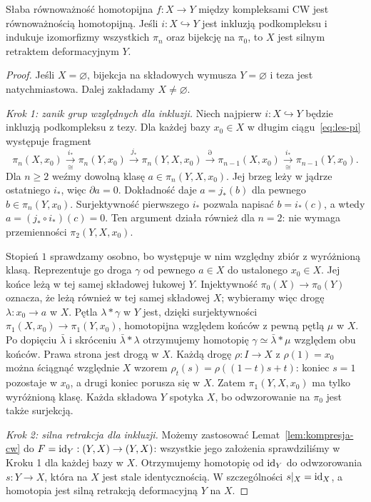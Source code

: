 \begin{twierdzenie}[Whitehead]
\label{thm:whitehead}
Słaba równoważność homotopijna $f:X\to Y$ między kompleksami CW
jest równoważnością homotopijną. Jeśli $i:X\hookrightarrow Y$
jest inkluzją podkompleksu i indukuje izomorfizmy wszystkich
$\pi_n$ oraz bijekcję na $\pi_0$, to $X$ jest silnym retraktem
deformacyjnym $Y$.
\end{twierdzenie}
\begin{proof}
Jeśli $X=\varnothing$, bijekcja na składowych wymusza
$Y=\varnothing$ i teza jest natychmiastowa.
Dalej zakładamy $X\ne\varnothing$.

\emph{Krok 1: zanik grup względnych dla inkluzji.}
Niech najpierw $i:X\hookrightarrow Y$ będzie inkluzją
podkompleksu z tezy. Dla każdej bazy $x_0\in X$
w długim ciągu~\eqref{eq:les-pi} występuje fragment
\[
 \pi_n(X,x_0)\xrightarrow[\cong]{i_*}\pi_n(Y,x_0)
 \xrightarrow{j_*}\pi_n(Y,X,x_0)
 \xrightarrow{\partial}\pi_{n-1}(X,x_0)
 \xrightarrow[\cong]{i_*}\pi_{n-1}(Y,x_0).
\]
Dla $n\geq2$ weźmy dowolną klasę $a\in\pi_n(Y,X,x_0)$.
Jej brzeg leży w jądrze ostatniego $i_*$, więc $\partial a=0$.
Dokładność daje $a=j_*(b)$ dla pewnego $b\in\pi_n(Y,x_0)$.
Surjektywność pierwszego $i_*$ pozwala napisać $b=i_*(c)$,
a wtedy $a=(j_*\circ i_*)(c)=0$.
Ten argument działa również dla $n=2$: nie wymaga przemienności
$\pi_2(Y,X,x_0)$.

Stopień $1$ sprawdzamy osobno, bo występuje w nim względny
zbiór z wyróżnioną klasą. Reprezentuje go droga $\gamma$
od pewnego $a\in X$ do ustalonego $x_0\in X$.
Jej końce leżą w tej samej składowej łukowej $Y$.
Injektywność $\pi_0(X)\to\pi_0(Y)$ oznacza, że leżą również
w tej samej składowej $X$; wybieramy więc drogę
$\lambda:x_0\to a$ w $X$.
Pętla $\lambda*\gamma$ w $Y$ jest, dzięki surjektywności
$\pi_1(X,x_0)\to\pi_1(Y,x_0)$, homotopijna względem końców
z pewną pętlą $\mu$ w $X$.
Po dopięciu $\bar\lambda$ i skróceniu $\bar\lambda*\lambda$
otrzymujemy homotopię $\gamma\simeq\bar\lambda*\mu$
względem obu końców. Prawa strona jest drogą w $X$.
Każdą drogę $\rho:I\to X$ z $\rho(1)=x_0$ można ściągnąć
względnie $X$ wzorem $\rho_t(s)=\rho((1-t)s+t)$:
koniec $s=1$ pozostaje w $x_0$, a drugi koniec porusza się w $X$.
Zatem $\pi_1(Y,X,x_0)$ ma tylko wyróżnioną klasę.
Każda składowa $Y$ spotyka $X$, bo odwzorowanie na $\pi_0$
jest także surjekcją.

\emph{Krok 2: silna retrakcja dla inkluzji.}
Możemy zastosować Lemat~\ref{lem:kompresja-cw} do
$F=\mathrm{id}_Y:(Y,X)\to(Y,X)$: wszystkie jego założenia
sprawdziliśmy w Kroku 1 dla każdej bazy w $X$.
Otrzymujemy homotopię od $\mathrm{id}_Y$ do odwzorowania $s:Y\to X$,
która na $X$ jest stale identycznością.
W szczególności $s|_X=\mathrm{id}_X$, a homotopia jest
silną retrakcją deformacyjną $Y$ na $X$.


\end{proof}
